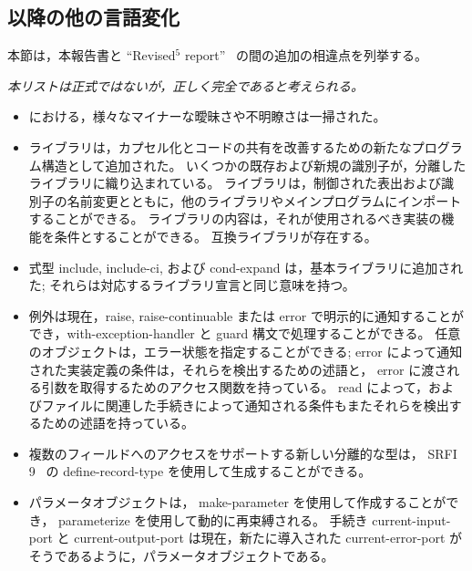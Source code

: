 \subsection*{\rfivers 以降の他の言語変化}
\label{differences}
本節は，本報告書と ``Revised$^5$ report''~\cite{R5RS} の間の追加の相違点を列挙する。

{\em 本リストは正式ではないが，正しく完全であると考えられる。}

\begin{itemize}

\item \rfivers における，様々なマイナーな曖昧さや不明瞭さは一掃された。

\item ライブラリは，カプセル化とコードの共有を改善するための新たなプログラム構造として追加された。
いくつかの既存および新規の識別子が，分離したライブラリに織り込まれている。
ライブラリは，制御された表出および識別子の名前変更とともに，他のライブラリやメインプログラムにインポートすることができる。
ライブラリの内容は，それが使用されるべき実装の機能を条件とすることができる。
\rfivers 互換ライブラリが存在する。

\item 式型 {\cf include}, {\cf include-ci}, および {\cf cond-expand} は，基本ライブラリに追加された;
それらは対応するライブラリ宣言と同じ意味を持つ。

\item 例外は現在，{\cf raise}, {\cf raise-continuable} または {\cf error} で明示的に通知することができ，{\cf with-exception-handler} と {\cf guard} 構文で処理することができる。
任意のオブジェクトは，エラー状態を指定することができる;
{\cf error} によって通知された実装定義の条件は，それらを検出するための述語と， {\cf error} に渡される引数を取得するためのアクセス関数を持っている。
{\cf read} によって，およびファイルに関連した手続きによって通知される条件もまたそれらを検出するための述語を持っている。

\item 複数のフィールドへのアクセスをサポートする新しい分離的な型は， SRFI 9~\cite{srfi9} の {\cf define-record-type} を使用して生成することができる。

\item パラメータオブジェクトは， {\cf make-parameter} を使用して作成することができ， {\cf parameterize} を使用して動的に再束縛される。
手続き {\cf current-input-port} と {\cf current-output-port} は現在，新たに導入された {\cf current-error-port} がそうであるように，パラメータオブジェクトである。


\end{itemize}
